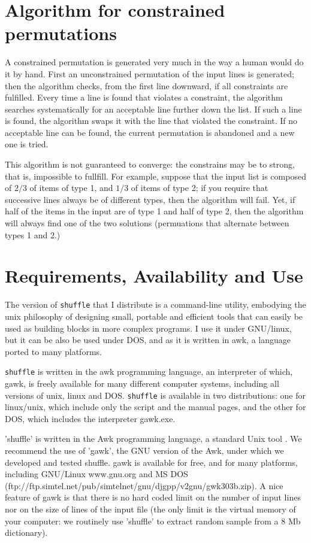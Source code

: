\documentclass[doc]{apa}
\newcommand{\href}[2]{#2}
\newcommand{\shuffle}{\texttt{shuffle}}
\begin{document}
\section*{Algorithm for constrained permutations}
 
A constrained permutation is generated very much in the way a human
would do it by hand. First an unconstrained permutation of the input
lines is generated; then the algorithm checks, from the first line
downward, if all constraints are fulfilled. Every time a line is found
that violates a constraint, the algorithm searches systematically for
an acceptable line further down the list. If such a line is found,
the algorithm swaps it with the line that violated the constraint. If
no acceptable line can be found, the current permutation is abandoned
and a new one is tried. 

This algorithm is not guaranteed to converge: the constrains may be to
strong, that is, impossible to fullfill. For example, suppose that the
input list is composed of $2/3$ of items of type 1, and $1/3$ of items
of type 2; if you require that successive lines always be of different
types, then the algorithm will fail. Yet, if half of the items in the
input are of type 1 and half of type 2, then the algorithm will always
find one of the two solutions (permuations that alternate between
types 1 and 2.)


\section*{Requirements, Availability and Use}

The version of \shuffle{} that I distribute is a command-line utility,
embodying the unix philosophy of designing small, portable and
efficient tools that can easily be used as building blocks in more
complex programs. I use it under GNU/linux, but it can be also be used
under DOS, and as it is written in awk, a language ported to many
platforms.

\shuffle{} is written in the awk programming language, an interpreter
of which, gawk, is freely available for many different computer
systems, including all versions of unix, linux and DOS. \shuffle{} is
available in two distributions: one for linux/unix, which include only
the script and the manual pages, and the other for DOS, which includes
the interpreter gawk.exe.


'shuffle' is written in the Awk programming language, a standard Unix
tool \cite{Aho88,SedAwk,Robbins97}. We recommend the use of 'gawk',
the GNU version of the Awk, under which we developed and tested
shuffle. gawk is available for free, and for many platforms, including
GNU/Linux \href{http://www.gnu.org}{www.gnu.org} and MS DOS
(\href{ftp://ftp.simtel.net/pub/simtelnet/gnu/djgpp/v2gnu/gwk303b.zip}{ftp://ftp.simtel.net/pub/simtelnet/gnu/djgpp/v2gnu/gwk303b.zip}).
A nice feature of gawk is that there is no hard coded limit on the
number of input lines nor on the size of lines of the input file (the
only limit is the virtual memory of your computer: we routinely use
'shuffle' to extract random sample from a 8 Mb dictionary).
\end{document}
